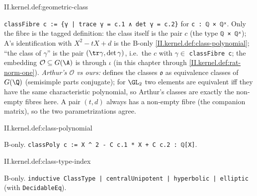 \begin{definition}
\end{definition}
\begin{tfformal}{II.kernel.def:geometric-class}
\begin{tffidelity}
\texttt{classFibre c := \{γ | trace γ = c.1 ∧ det γ = c.2\}} for \texttt{c : ℚ × ℚˣ}. Only the fibre is the tagged definition: the class itself is the pair $c$ (the type \texttt{ℚ × ℚˣ}); A's identification with $X^2-tX+d$ is the B-only \cref{II.kernel.def:class-polynomial}; ``the class of $\gamma$'' is the pair $(\tr\gamma,\det\gamma)$, i.e.\ the $c$ with $\gamma\in$ \texttt{classFibre c}; the embedding $\mathcal O\subseteq G(\A)$ is through $\iota$ (in this chapter through \cref{II.kernel.def:rat-norm-one}). \emph{Arthur's $\mathcal O$ vs ours:} \cite[§10]{AIntro} defines the classes $\mathfrak o$ as equivalence classes of $G(\Q)$ (semisimple parts conjugate); for $\GL_2$ two elements are equivalent iff they have the same characteristic polynomial, so Arthur's classes are exactly the non-empty fibres here. A pair $(t,d)$ always has a non-empty fibre (the companion matrix), so the two parametrizations agree.
\end{tffidelity}
\end{tfformal}

\begin{definition}
\bonly
{}
\end{definition}
\begin{tfformal}{II.kernel.def:class-polynomial}
\begin{tffidelity}
B-only. \texttt{classPoly c := X \^{} 2 - C c.1 * X + C c.2 : ℚ[X]}.
\end{tffidelity}
\end{tfformal}

\begin{definition}
\bonly
{}
\end{definition}
\begin{tfformal}{II.kernel.def:class-type-index}
\begin{tffidelity}
B-only. \texttt{inductive ClassType | centralUnipotent | hyperbolic | elliptic} (with \texttt{DecidableEq}).
\end{tffidelity}
\end{tfformal}

